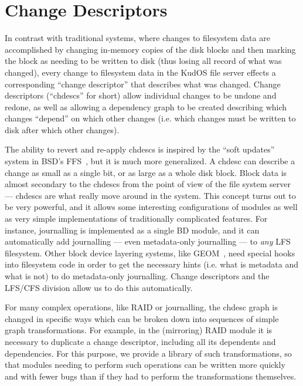 \section{Change Descriptors}
\label{sec:chdescs}

In contrast with traditional systems, where changes to filesystem data are
accomplished by changing in-memory copies of the disk blocks and then marking
the block as needing to be written to disk (thus losing all record of what was
changed), every change to filesystem data in the KudOS file server effects a
corresponding ``change descriptor'' that describes what was changed. Change
descriptors (``chdescs'' for short) allow individual changes to be undone and
redone, as well as allowing a dependency graph to be created describing which
changes ``depend'' on which other changes (i.e. which changes must be written to
disk after which other changes).

The ability to revert and re-apply chdescs is inspired by the ``soft updates''
system in BSD's FFS~\cite{ganger00soft}, but it is much more generalized. A
chdesc can describe a change as small as a single bit, or as large as a whole
disk block. Block data is almost secondary to the chdescs from the point of view
of the file system server --- chdescs are what really move around in the system.
This concept turns out to be very powerful, and it allows some interesting
configurations of modules as well as very simple implementations of
traditionally complicated features. For instance, journalling is implemented as
a single BD module, and it can automatically add journalling --- even
metadata-only journalling --- to {\it any} LFS filesystem. Other block device
layering systems, like GEOM~\cite{geom}, need special hooks into filesystem code
in order to get the necessary hints (i.e. what is metadata and what is not) to
do metadata-only journalling. Change descriptors and the LFS/CFS division allow
us to do this automatically.

For many complex operations, like RAID or journalling, the chdesc graph is
changed in specific ways which can be broken down into sequences of simple graph
transformations. For example, in the (mirroring) RAID module it is necessary to
duplicate a change descriptor, including all its dependents and dependencies.
For this purpose, we provide a library of such transformations, so that modules
needing to perform such operations can be written more quickly and with fewer
bugs than if they had to perform the transformations themselves.
